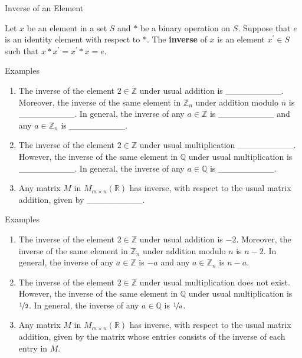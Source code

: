 \documentclass{beamer}
\begin{document}
\begin{frame}{Inverse of an Element}
\begin{definition}
\justifying
Let $x$ be an element in a set $S$ and $*$ be a binary operation on $S$. Suppose that $e$ is an identity element with respect to $*$. The \textbf{inverse} of $x$ is an element $x^{\prime} \in S$ such that $x * x^{\prime} = x^{\prime} * x = e$. 
\end{definition}    
\end{frame}

\begin{frame}{Examples}
\begin{enumerate}
\justifying
\item The inverse of the element $2 \in \mathbb{Z}$ under usual addition is \_\_\_\_\_\_\_\_\_. Moreover, the inverse of the same element in $\mathbb{Z}_n$ under addition modulo $n$ is \_\_\_\_\_\_\_\_\_. In general, the inverse of any $a \in \mathbb{Z}$ is \_\_\_\_\_\_\_\_\_ and any $a \in \mathbb{Z}_n$ is \_\_\_\_\_\_\_\_\_.  
\item The inverse of the element $2 \in \mathbb{Z}$ under usual multiplication \_\_\_\_\_\_\_\_\_. However, the inverse of the same element in $\mathbb{Q}$ under usual multiplication is \_\_\_\_\_\_\_\_\_. In general, the inverse of any $a \in \mathbb{Q}$ is \_\_\_\_\_\_\_\_\_.    
\item Any matrix $M$ in $M_{m \times n}(\mathbb{R})$ has inverse, with respect to the usual matrix addition, given by \_\_\_\_\_\_\_\_\_.
\end{enumerate}
\end{frame}

\begin{frame}{Examples}
\begin{enumerate}
\justifying
\item The inverse of the element $2 \in \mathbb{Z}$ under usual addition is $-2$. Moreover, the inverse of the same element in $\mathbb{Z}_n$ under addition modulo $n$ is $n - 2$. In general, the inverse of any $a \in \mathbb{Z}$ is $-a$ and any $a \in \mathbb{Z}_n$ is $n - a$.  
\pause
\item The inverse of the element $2 \in \mathbb{Z}$ under usual multiplication does not exist. However, the inverse of the same element in $\mathbb{Q}$ under usual multiplication is $\nicefrac{1}{2}$. In general, the inverse of any $a \in \mathbb{Q}$ is $\nicefrac{1}{a}$.    
\pause
\item Any matrix $M$ in $M_{m \times n}(\mathbb{R})$ has inverse, with respect to the usual matrix addition, given by the matrix whose entries consists of the inverse of each entry in $M$.
\end{enumerate}
\end{frame}
\end{document}
